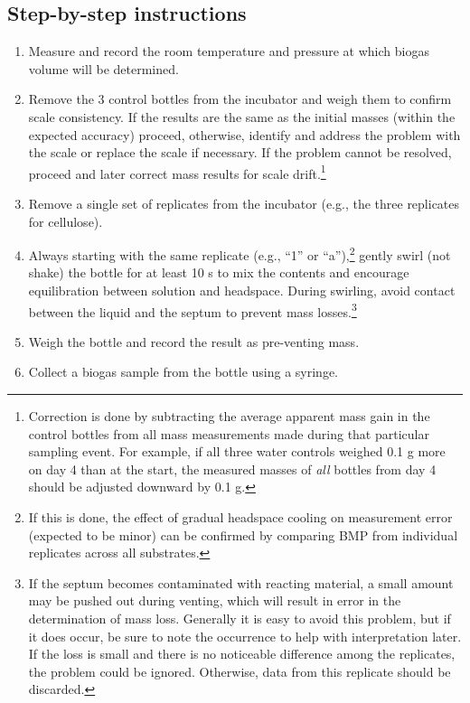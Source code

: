 \documentclass[]{article}
\begin{document}
\subsection{Step-by-step instructions} 
\label{sec:steps}
\begin{enumerate}
    \item Measure and record the room temperature and pressure at which biogas volume will be determined.
    \item Remove the 3 control bottles from the incubator and weigh them to confirm scale consistency. 
      If the results are the same as the initial masses (within the expected accuracy) proceed, otherwise, identify and address the problem with the scale or replace the scale if necessary.
      If the problem cannot be resolved, proceed and later correct mass results for scale drift.\footnote{
        Correction is done by subtracting the average apparent mass gain in the control bottles from all mass measurements made during that particular sampling event. 
        For example, if all three water controls weighed 0.1 g more on day 4 than at the start, the measured masses of \textit{all} bottles from day 4 should be adjusted downward by 0.1 g.
      }
    \item Remove a single set of replicates from the incubator (e.g., the three replicates for cellulose).
    \item Always starting with the same replicate (e.g., ``1'' or ``a''),\footnote{
        If this is done, the effect of gradual headspace cooling on measurement error (expected to be minor) can be confirmed by comparing BMP from individual replicates across all substrates.
      } gently swirl (not shake) the bottle for at least 10 s to mix the contents and encourage  equilibration between solution and headspace. 
      During swirling, avoid contact between the liquid and the septum to prevent mass losses.\footnote{
        If the septum becomes contaminated with reacting material, a small amount may be pushed out during venting, which will result in error in the determination of mass loss.
        Generally it is easy to avoid this problem, but if it does occur, be sure to note the occurrence to help with interpretation later.
        If the loss is small and there is no noticeable difference among the replicates, the problem could be ignored. 
        Otherwise, data from this replicate should be discarded.
      }
    \item Weigh the bottle and record the result as pre-venting mass.
    \item Collect a biogas sample from the bottle using a syringe. 

\end{enumerate}
\end{document}
